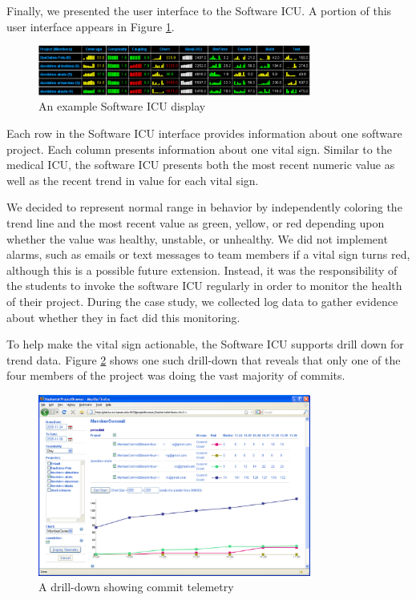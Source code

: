 \documentclass[times,10pt,twocolumn]{article}
\begin{document}
Finally, we presented the user interface to the Software ICU. A portion of
this user interface appears in Figure \ref{fig:sicu}.

\begin{figure}[ht]
  \center
  \includegraphics[width=0.8\textwidth]{portfolio-2008.eps}
  \caption{An example Software ICU display}
  \label{fig:sicu}
\end{figure} 

Each row in the Software ICU interface provides information about one
software project.  Each column presents information about
one vital sign. Similar to the medical ICU, the software ICU presents both
the most recent numeric value as well as the recent trend in value for each
vital sign.

We decided to represent normal range in behavior by independently
coloring the trend line and the most recent value as green, yellow, or red
depending upon whether the value was healthy, unstable, or
unhealthy.  We did not implement alarms, such as emails or text
messages to team members if a vital sign turns red, although this is a
possible future extension.  Instead, it was the responsibility of the
students to invoke the software ICU regularly in order to monitor the
health of their project.  During the case study, we collected log data to
gather evidence about whether they in fact did this monitoring.

To help make the vital sign actionable, the Software ICU supports drill
down for trend data.  Figure \ref{fig:telemetry} shows one such drill-down
that reveals that only one of the four members of the project was doing the
vast majority of commits.

\begin{figure}[ht]
  \center
  \includegraphics[width=0.8\textwidth]{telemetry-screen.eps}
  \caption{A drill-down showing commit telemetry}
  \label{fig:telemetry}
\end{figure} 
\end{document}
